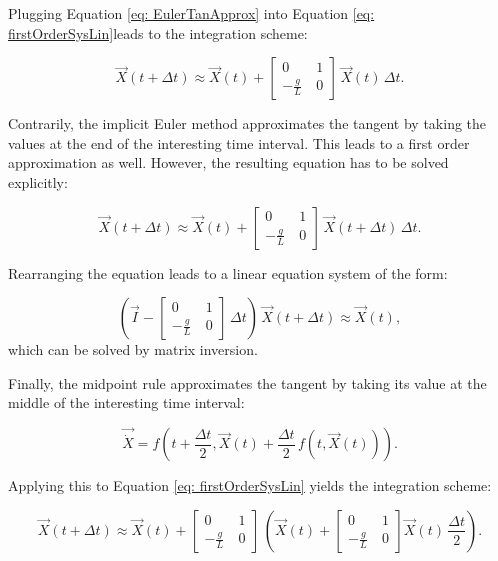 \documentclass[12pt,bibstyle=none,pagenumberinfooter]{ifmdocument}
\begin{document}
Plugging Equation \ref{eq: EulerTanApprox} into Equation \ref{eq: firstOrderSysLin}leads to the integration scheme:

\begin{equation}
    \Vec{X}(t+\Delta t) \approx \Vec{X}(t) + \begin{bmatrix}
        0 & 1 \\ -\frac{g}{L}\ & 0 
        \end{bmatrix} \, \Vec{X}(t) \, \Delta t.
\end{equation}

Contrarily, the implicit Euler method approximates the tangent by taking the values at the end of the interesting time interval. This leads to a first order approximation as well. However, the resulting equation has to be solved explicitly:

\begin{equation}
    \Vec{X}(t+\Delta t) \approx \Vec{X}(t) + \begin{bmatrix}
        0 & 1 \\ -\frac{g}{L}\ & 0 
        \end{bmatrix} \, \Vec{X}(t+\Delta t) \, \Delta t.
\end{equation}

Rearranging the equation leads to a linear equation system of the form:

\begin{equation}
    \left(\vec{I} - \begin{bmatrix}
        0 & 1 \\ -\frac{g}{L}\ & 0 
        \end{bmatrix}\,\Delta t \right)\,\Vec{X}(t+\Delta t) \approx \Vec{X}(t),
\end{equation}
which can be solved by matrix inversion.

Finally, the midpoint rule approximates the tangent by taking its value at the middle of the interesting time interval:

\begin{equation}
    \Vec{\Dot{X}} = f\left( t+\frac{\Delta t}{2}, \Vec{X}(t) + \frac{\Delta t}{2}\,f\left(t, \Vec{X}(t)\right) \right).
\end{equation}

Applying this to Equation \ref{eq: firstOrderSysLin} yields the integration scheme:

\begin{equation}
    \Vec{X}(t+\Delta t) \approx \vec{X}(t) + \begin{bmatrix}
        0 & 1 \\ -\frac{g}{L}\ & 0 
        \end{bmatrix}\,\left(\Vec{X}(t) + \begin{bmatrix}
        0 & 1 \\ -\frac{g}{L}\ & 0 
        \end{bmatrix} \Vec{X}(t)\, \frac{\Delta t}{2} \right).
\end{equation}
\end{document}
